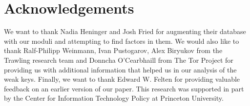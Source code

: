 \section*{Acknowledgements}
We want to thank Nadia Heninger and Josh Fried for augmenting their database
with our moduli and attempting to find factors in them. We would also like to
thank Ralf-Philipp Weinmann, Ivan Pustogarov, Alex Biryukov from the Trawling
research team and Donncha O'Cearbhaill from The Tor Project for providing us
with additional information that helped us in our analysis of the weak keys.
Finally, we want to thank Edward W. Felten for providing valuable feedback on an
earlier version of our paper.  This research was supported in part by the Center
for Information Technology Policy at Princeton University.
